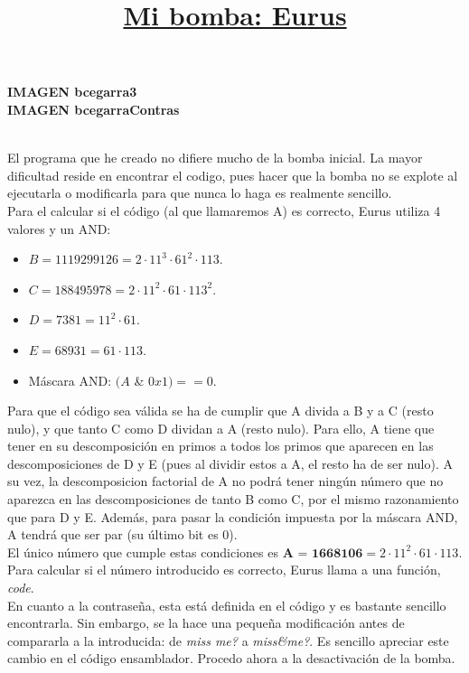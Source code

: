 \documentclass[11pt,a4paper]{article}
\begin{document}
\textbf{IMAGEN bcegarra3} \\
\textbf{IMAGEN bcegarraContras} \\


\title{\large{\textbf{\underline{Mi bomba: Eurus}}}} \\

El programa que he creado no difiere mucho de la bomba inicial. La mayor dificultad reside en encontrar el codigo, pues hacer que la bomba no se explote al ejecutarla o modificarla para que nunca lo haga es realmente sencillo. \\

Para el calcular si el código (al que llamaremos A) es correcto, Eurus utiliza 4 valores y un AND:
\begin{itemize}
	\item $B = 1119299126 = 2\cdot11^{3}\cdot61^{2}\cdot113$. 
	\item $C = 188495978 = 2\cdot11^{2}\cdot61\cdot113^{2}$.
	\item $D = 7381 = 11^{2}\cdot61$.
	\item $E = 68931 = 61\cdot113$.
	\item Máscara AND: $(A$ \& $0x1) == 0$.
\end{itemize}

Para que el código sea válida se ha de cumplir que A divida a B y a C (resto nulo), y que tanto C como D dividan a A (resto nulo). Para ello, A tiene que tener en su descomposición en primos a todos los primos que aparecen en las descomposiciones de D y E (pues al dividir estos a A, el resto ha de ser nulo). A su vez, la descomposicion factorial de A no podrá tener ningún número que no aparezca en las descomposiciones de tanto B como C, por el mismo razonamiento que para D y E. Además, para pasar la condición impuesta por la máscara AND, A tendrá que ser par (su último bit es 0). \\

El único número que cumple estas condiciones es $\textbf{A = 1668106} = 2\cdot11^{2}\cdot61\cdot113$. Para calcular si el número introducido es correcto, Eurus llama a una función, \emph{code}.\\

En cuanto a la contraseña, esta está definida en el código y es bastante sencillo encontrarla. Sin embargo, se la hace una pequeña modificación antes de compararla a la introducida: de \emph{miss me?} a \emph{miss\&me?}. Es sencillo apreciar este cambio en el código ensamblador. Procedo ahora a la desactivación de la bomba. \\
\end{document}
